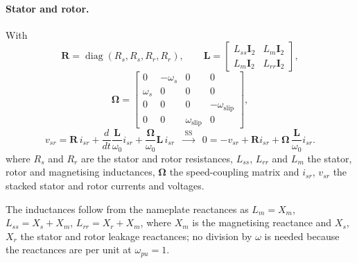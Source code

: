 \documentclass[11pt]{article}
\newcommand{\wnom}{\omega_0}
\newcommand{\wsys}{\omega_s}
\begin{document}
\paragraph{Stator and rotor.}
With
\begin{equation}
  \bm{R} = \operatorname{diag}(R_s,R_s,R_r,R_r),\qquad
  \bm{L} = \begin{bmatrix} L_{ss}\bm{I}_2 & L_m\bm{I}_2 \\ L_m\bm{I}_2 & L_{rr}\bm{I}_2\end{bmatrix},
\end{equation}
\begin{equation}
  \bm{\Omega} = \begin{bmatrix}
    0 & -\wsys & 0 & 0\\ \wsys & 0 & 0 & 0\\
    0 & 0 & 0 & -\omega_{\text{slip}}\\ 0 & 0 & \omega_{\text{slip}} & 0
  \end{bmatrix},
\end{equation}
\begin{equation}
  v_{sr} = \bm{R}\,i_{sr} + \frac{d}{dt}\frac{\bm{L}}{\wnom}i_{sr} + \frac{\bm{\Omega}}{\wnom}\bm{L}\,i_{sr}
  \;\;\xrightarrow{\;\text{SS}\;}\;\;
  0 = -v_{sr} + \bm{R}i_{sr} + \bm{\Omega}\,\frac{\bm{L}}{\wnom}i_{sr}.
\end{equation}
where $R_s$ and $R_r$ are the stator and rotor resistances, $L_{ss}$,
$L_{rr}$ and $L_m$ the stator, rotor and magnetising inductances,
$\bm{\Omega}$ the speed-coupling matrix and $i_{sr}$, $v_{sr}$ the stacked
stator and rotor currents and voltages.

The inductances follow from the nameplate reactances as
$L_m = X_m$, $L_{ss} = X_s + X_m$, $L_{rr} = X_r + X_m$, where $X_m$ is the
magnetising reactance and $X_s$, $X_r$ the stator and rotor leakage
reactances; no division by $\omega$ is needed because the reactances are
per unit at $\omega_{pu}=1$.
\end{document}
